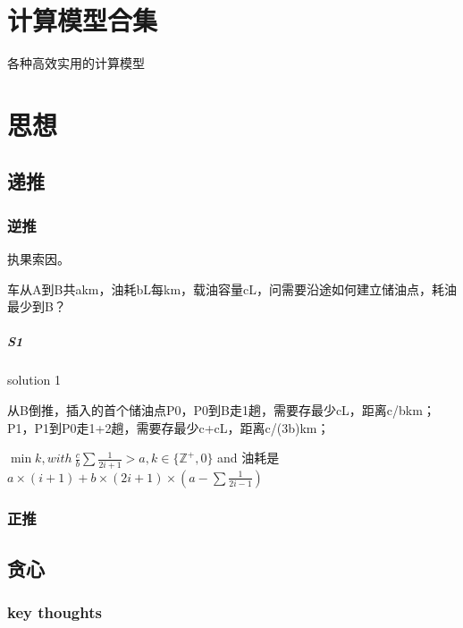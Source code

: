 \documentclass[UTF8]{../computerUniverse}
\begin{document}
\chapter{计算模型合集}
各种高效实用的计算模型







\chapter{思想}

\section{递推}

\subsection{逆推}
执果索因。


\begin{question}
 车从A到B共akm，油耗bL每km，载油容量cL，问需要沿途如何建立储油点，耗油最少到B？

  \paragraph{S1} solution 1

  从B倒推，插入的首个储油点P0，P0到B走1趟，需要存最少cL，距离c/bkm；
  P1，P1到P0走1+2趟，需要存最少c+cL，距离c/(3b)km；



  $\min k, with \ \frac{c}{b}\sum\frac{1}{2i+1} > a, k\in \{ \mathbb{Z} ^+, 0\}$ and 油耗是$a \times (i+1) + b \times(2i+1) \times (a - \sum\frac{1}{2i-1})$

\end{question}

\subsection{正推}

\section{贪心}


\subsection{key thoughts}
\end{document}
